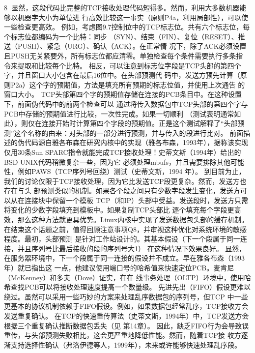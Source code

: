                                                     8
显然，这段代码比完整的TCP接收处理代码短得多。然而，利用大多数机器能够以机器字大小为单位进
行高效比较这一事实（原则P4a，利用局部性），可以使一些检查更高效。
例如，考虑图9.7控制位中的TCP标志位。共有六个标志位，每个标志位都编码为一个比特：同步
（SYN）、结束（FIN）、复位（RESET）、推送（PUSH）、紧急（URG）、确认（ACK）。在正常情
况下，除了ACK必须设置且PUSH无关紧要外，所有标志位都应清零。单独检查每个条件需要执行多条指
令来提取和比较每个比特。
相反，可以注意到标志位字段是TCP头部的第四个字，并且窗口大小包含在最后16位中。在头部预测代
码中，发送方预先计算（原则P2a）这个字的预期值，方法是填充所有预期的标志位值，并使用上次通告
的窗口大小。
TCP头部第四个字的预期值存储在连接的PCB条目中。在这种设置下，前面伪代码中的前两个检查可以
通过将传入数据包中TCP头部的第四个字与PCB中存储的预期值进行比较，一次性完成。如果一切顺利
（测试表明通常如此），则仅在连接开始时计算第四个字段的预期值。正是这个测试解释了“头部预
测”这个名称的由来：对头部的一部分进行预测，并与传入的段进行比对。
前面描述的伪代码源自雅各布森在研究内核中的实现（雅各布森，1993年），据称该实现仅用30条Sun
SPARC指令就能完成TCP接收处理！史蒂文斯（1994年）给出的BSD UNIX代码稍微复杂一些，因为它
必须处理mbufs，并且需要排除其他可能性，例如PAWS（TCP序列号回绕）测试（史蒂文斯，1994
年）。
到目前为止，我们的讨论仅限于TCP接收处理，因为它比发送TCP段更复杂。然而，发送方也存在与头
部预测类似的机制。如果各个段之间只有少数字段发生变化，发送方可以从在连接块中保留一个模板
TCP（和IP）头部中受益。发送段时，发送方只需将变化的少数字段填充到模板中。如果复制TCP头部比
逐个填充每个字段更高效，那么这种方法就更具优势。Linux内核中实现了发送数据包头部的缓存机制。
在结束这个话题之前，值得回顾注意事项Q8，并审视这种优化对系统环境的敏感程度。最初，头部预测
是针对工作站设计的。其基本假设（下一个段属于同一连接，并且序列号比最后接收的段的序列号大1）
在这种情况下效果良好。
显然，在服务器环境中，下一个段属于同一连接的假设并不成立。早在雅各布森（1993年）就已指出这
一点，他建议使用端口号的哈希值来快速定位PCB。麦肯尼（McKenney）和多夫（Dove）证实，在在
线事务处理（OLTP）环境中，使用哈希查找PCB可以将接收处理速度提高一个数量级。
先进先出（FIFO）假设更难以绕过。虽然可以采用一些巧妙的方案来处理乱序数据包的序列号，但TCP
中一些更基本的协议机制依赖于FIFO假设。例如，如果数据包经常乱序，TCP接收方会发送重复确认。
在TCP的快速重传算法（史蒂文斯，1994年）中，TCP发送方会根据三个重复确认推断数据包丢失（见
第14章）。
因此，缺乏FIFO行为会导致误重传，与头部预测失败相比，这会更严重地降低性能。然而，随着TCP接
收方逐渐支持选择性确认（弗洛伊德等人，1999年），未来或许能够快速处理乱序段。

